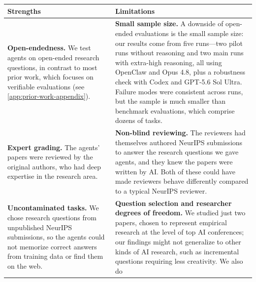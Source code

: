 {
\begin{table}[!t]
\small
{}
\label{tab:shadow-eval-strengths-limitations}
\nopagebreak[4]
\vspace{4pt}
\noindent\begin{tabular*}{\linewidth}{@{\extracolsep{\fill}}%
    >{\raggedright\arraybackslash}p{0.43\linewidth}%
    >{\raggedright\arraybackslash}p{0.57\linewidth}%
    @{}}
\toprule
\textbf{Strengths} & \textbf{Limitations} \\
\midrule
\textbf{Open-endedness.} We test agents on open-ended research questions, in
contrast to most prior work, which focuses on verifiable evaluations (see
\cref{app:prior-work-appendix}). &
\textbf{Small sample size.} A downside of open-ended evaluations is the small
sample size: our results come from five runs---two pilot runs without
reasoning and two main runs with extra-high reasoning, all using OpenClaw and
Opus 4.8, plus a robustness check with Codex and GPT-5.6 Sol Ultra. Failure modes were
consistent across runs, but the sample is much smaller than benchmark
evaluations, which comprise dozens of tasks. \\
\addlinespace[6pt]
\textbf{Expert grading.} The agents' papers were reviewed by the original
authors, who had deep expertise in the research area. &
\textbf{Non-blind reviewing.} The reviewers had themselves authored NeurIPS
submissions to answer the research questions we gave agents, and they knew
the papers were written by AI. Both of these could have made reviewers behave differently compared to a typical NeurIPS reviewer.  \\
\addlinespace[6pt]
\textbf{Uncontaminated tasks.} We chose research questions from unpublished
NeurIPS submissions, so the agents could not memorize correct answers from
training data or find them on the web. &
\textbf{Question selection and researcher degrees of freedom.} We studied
just two papers, chosen to represent empirical research at the level of top
AI conferences; our findings might not generalize to other kinds of AI
research, such as incremental questions requiring less creativity. We also do

\end{tabular*}
\end{table}}
